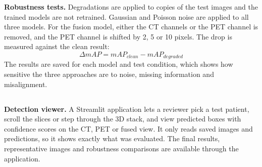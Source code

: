 \textbf{Robustness tests.} Degradations are applied to copies of the test images and the trained models are not retrained. Gaussian and Poisson noise are applied to all three models. For the fusion model, either the CT channels or the PET channel is removed, and the PET channel is shifted by 2, 5 or 10 pixels. The drop is measured against the clean result:
\begin{equation}
	\Delta mAP = mAP_{clean} - mAP_{degraded}
\end{equation}
The results are saved for each model and test condition, which shows how sensitive the three approaches are to noise, missing information and misalignment.

\subsection[Patient Viewer Application]{}

\textbf{Detection viewer.} A Streamlit application lets a reviewer pick a test patient, scroll the slices or step through the 3D stack, and view predicted boxes with confidence scores on the CT, PET or fused view. It only reads saved images and predictions, so it shows exactly what was evaluated. The final results, representative images and robustness comparisons are available through the  application.
